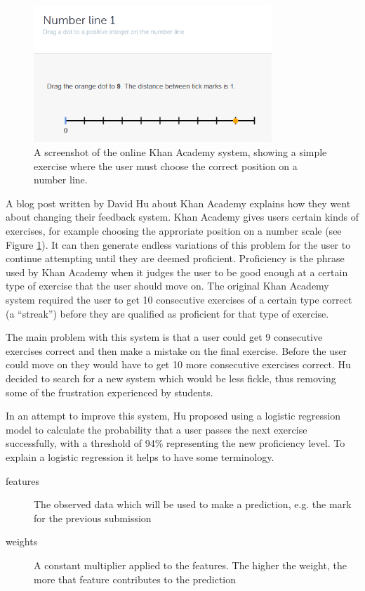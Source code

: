 \begin{figure}[h!]
\centering
\includegraphics[width=0.8\textwidth]{images/kascreenshot.png}
\caption{A screenshot of the online Khan Academy system, showing a simple exercise where the user must choose the correct position on a number line.}
\label{fig:kascreenshot}
\end{figure}

A blog post\cite{khan_blog} written by David Hu about Khan Academy explains how they went about changing their feedback system. Khan Academy gives users certain kinds of exercises, for example choosing the approriate position on a number scale (see Figure \ref{fig:kascreenshot}). It can then generate endless variations of this problem for the user to continue attempting until they are deemed proficient. Proficiency is the phrase used by Khan Academy when it judges the user to be good enough at a certain type of exercise that the user should move on. The original Khan Academy system required the user to get 10 consecutive exercises of a certain type correct (a ``streak'') before they are qualified as proficient for that type of exercise. 

The main problem with this system is that a user could get 9 consecutive exercises correct and then make a mistake on the final exercise. Before the user could move on they would have to get 10 more consecutive exercises correct. Hu decided to search for a new system which would be less fickle, thus removing some of the frustration experienced by students.

In an attempt to improve this system, Hu proposed using a logistic regression model to calculate the probability that a user passes the next exercise successfully, with a threshold of 94\% representing the new proficiency level. To explain a logistic regression it helps to have some terminology. 

\begin{description}
\item[features] The observed data which will be used to make a prediction, e.g. the mark for the previous submission
\item[weights] A constant multiplier applied to the features. The higher the weight, the more that feature contributes to the prediction
\end{description}

